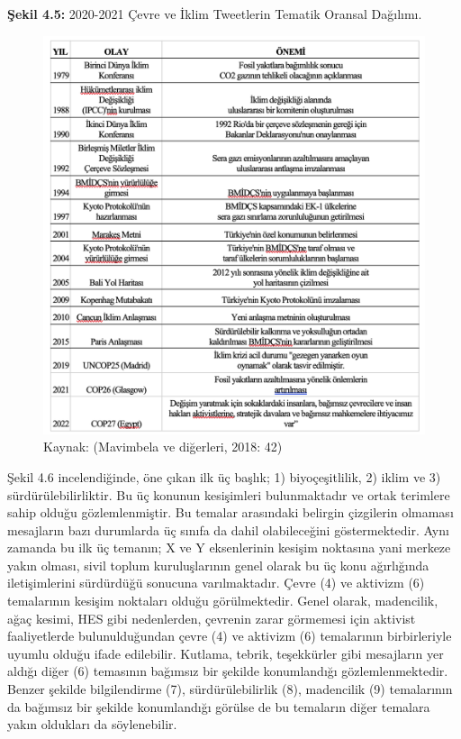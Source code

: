 \documentclass[
]{book}
\begin{document}
\textbf{Şekil 4.5:} 2020-2021 Çevre ve İklim Tweetlerin Tematik Oransal Dağılımı.

\begin{figure}
\includegraphics[width=0.95\linewidth,height=0.95\textheight]{tablolar-sekiller/tablo-2-1} \caption{Kaynak: (Mavimbela ve diğerleri, 2018: 42)}\label{fig:unnamed-chunk-13}
\end{figure}

Şekil 4.6 incelendiğinde, öne çıkan ilk üç başlık; 1) biyoçeşitlilik, 2) iklim ve 3) sürdürülebilirliktir. Bu üç konunun kesişimleri bulunmaktadır ve ortak terimlere sahip olduğu gözlemlenmiştir. Bu temalar arasındaki belirgin çizgilerin olmaması mesajların bazı durumlarda üç sınıfa da dahil olabileceğini göstermektedir. Aynı zamanda bu ilk üç temanın; X ve Y eksenlerinin kesişim noktasına yani merkeze yakın olması, sivil toplum kuruluşlarının genel olarak bu üç konu ağırlığında iletişimlerini sürdürdüğü sonucuna varılmaktadır. Çevre (4) ve aktivizm (6) temalarının kesişim noktaları olduğu görülmektedir. Genel olarak, madencilik, ağaç kesimi, HES gibi nedenlerden, çevrenin zarar görmemesi için aktivist faaliyetlerde bulunulduğundan çevre (4) ve aktivizm (6) temalarının birbirleriyle uyumlu olduğu ifade edilebilir. Kutlama, tebrik, teşekkürler gibi mesajların yer aldığı diğer (6) temasının bağımsız bir şekilde konumlandığı gözlemlenmektedir. Benzer şekilde bilgilendirme (7), sürdürülebilirlik (8), madencilik (9) temalarının da bağımsız bir şekilde konumlandığı görülse de bu temaların diğer temalara yakın oldukları da söylenebilir.
\end{document}
